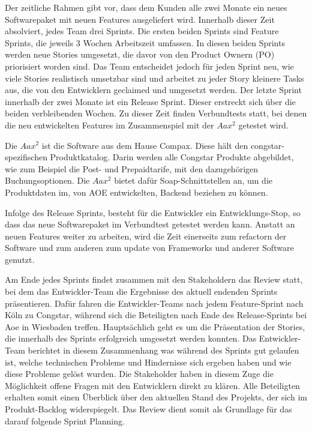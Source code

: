 \documentclass[11pt,a4paper]{article} %
\begin{document}
Der zeitliche Rahmen gibt vor, dass dem Kunden alle zwei Monate ein neues Softwarepaket mit neuen Features ausgeliefert wird. 
Innerhalb dieser Zeit absolviert, jedes Team drei Sprints. Die ersten beiden Sprints sind Feature Sprints, 
die jeweils 3 Wochen Arbeitszeit umfassen. In diesen beiden Sprints werden neue Stories umgesetzt, 
die davor von den Product Ownern (PO) priorisiert worden sind. Das Team
entscheidet jedoch für jeden Sprint neu, wie viele Stories realistisch umsetzbar sind und arbeitet zu jeder Story kleinere Tasks aus, 
die von den Entwicklern geclaimed und umgesetzt werden. Der letzte
Sprint innerhalb der zwei Monate ist ein Release Sprint.
Dieser erstreckt sich über die beiden verbleibenden Wochen. 
Zu dieser Zeit finden Verbundtests statt, bei denen die neu entwickelten Features im Zusammenspiel mit der $Aax^{2}$ getestet wird. 

Die $Aax^{2}$ ist die Software aus dem Hause Compax. Diese hält den congstar-spezifischen Produktkatalog.
Darin werden alle Congstar Produkte abgebildet, wie zum Beispiel die Post- und
Prepaidtarife, mit den dazugehörigen Buchungsoptionen.
Die $Aax^{2}$ bietet dafür Soap-Schnittstellen an, um die Produktdaten im, von
AOE entwickelten, Backend beziehen zu können.

Infolge des Release Sprints, besteht für die Entwickler ein Entwicklungs-Stop, 
so dass das neue Softwarepaket im Verbundtest getestet werden kann. Anstatt an neuen Features weiter zu arbeiten, 
wird die Zeit einerseits zum refactorn der Software und zum anderen zum update von Frameworks und anderer Software genutzt.

Am Ende jedes Sprints findet zusammen mit den Stakeholdern das Review statt, 
bei dem das Entwickler-Team die Ergebnisse des aktuell endenden Sprints
präsentieren.
Dafür fahren die Entwickler-Teams nach jedem Feature-Sprint nach Köln zu
Congstar, während sich die Beteiligten nach Ende des Release-Sprints bei Aoe in
Wiesbaden treffen.
Hauptsächlich geht es um die Präsentation der Stories, die innerhalb des
Sprints erfolgreich umgesetzt werden konnten.
Das Entwickler-Team berichtet in diesem Zusammenhang was während des Sprints gut
gelaufen ist, welche technischen Probleme und Hindernisse sich ergeben haben und
wie diese Probleme gelöst wurden. Die Stakeholder haben in diesem Zuge die
Möglichkeit offene Fragen mit den Entwicklern direkt zu klären. Alle Beteiligten
erhalten somit einen Überblick über den aktuellen Stand des Projekts, der sich
im Produkt-Backlog widerspiegelt.
Das Review dient somit als Grundlage für das darauf folgende Sprint Planning.
\end{document}
